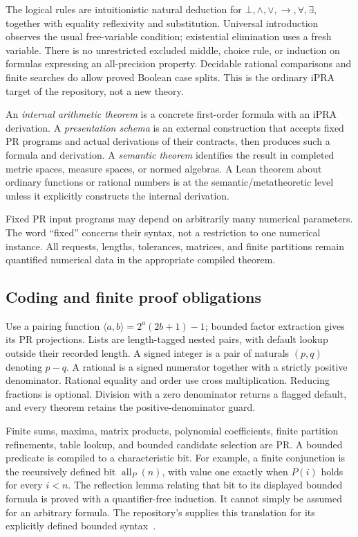 The logical rules are intuitionistic natural deduction for $\bot,\wedge,\vee,\to,\forall,\exists$, together with equality reflexivity and substitution. Universal introduction observes the usual free-variable condition; existential elimination uses a fresh variable. There is no unrestricted excluded middle, choice rule, or induction on formulas expressing an all-precision property. Decidable rational comparisons and finite searches do allow proved Boolean case splits. This is the ordinary iPRA target of the repository, not a new theory.

\begin{definition}\label{def:three-levels}
An \emph{internal arithmetic theorem} is a concrete first-order formula with an iPRA derivation. A \emph{presentation schema} is an external construction that accepts fixed PR programs and actual derivations of their contracts, then produces such a formula and derivation. A \emph{semantic theorem} identifies the result in completed metric spaces, measure spaces, or normed algebras. A Lean theorem about ordinary functions or rational numbers is at the semantic/metatheoretic level unless it explicitly constructs the internal derivation.
\end{definition}

Fixed PR input programs may depend on arbitrarily many numerical parameters. The word ``fixed'' concerns their syntax, not a restriction to one numerical instance. All requests, lengths, tolerances, matrices, and finite partitions remain quantified numerical data in the appropriate compiled theorem.

\subsection{Coding and finite proof obligations}

Use a pairing function $\langle a,b\rangle=2^a(2b+1)-1$; bounded factor extraction gives its PR projections. Lists are length-tagged nested pairs, with default lookup outside their recorded length. A signed integer is a pair of naturals $(p,q)$ denoting $p-q$. A rational is a signed numerator together with a strictly positive denominator. Rational equality and order use cross multiplication. Reducing fractions is optional. Division with a zero denominator returns a flagged default, and every theorem retains the positive-denominator guard.

Finite sums, maxima, matrix products, polynomial coefficients, finite partition refinements, table lookup, and bounded candidate selection are PR. A bounded predicate is compiled to a characteristic bit. For example, a finite conjunction is the recursively defined bit $\operatorname{all}_P(n)$, with value one exactly when $P(i)$ holds for every $i<n$. The reflection lemma relating that bit to its displayed bounded formula is proved with a quantifier-free induction. It cannot simply be assumed for an arbitrary formula. The repository's  supplies this translation for its explicitly defined bounded syntax~\cite{repo-interfaces}.

